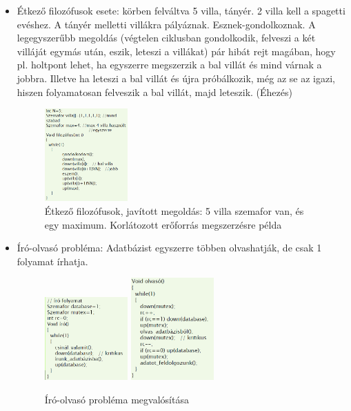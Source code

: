 \documentclass[margin=0px]{article}
\begin{document}
	\begin{itemize}
		\item Étkező filozófusok esete: körben felváltva 5 villa, tányér. 2 villa kell a spagetti
		evéshez. A tányér melletti villákra pályáznak. Esznek-gondolkoznak. A legegyszerűbb megoldás (végtelen ciklusban gondolkodik, felveszi a két villáját egymás után, eszik, leteszi a villákat) pár hibát rejt magában, hogy pl. holtpont lehet, ha egyszerre megszerzik a bal villát és mind várnak a jobbra. Illetve ha leteszi a bal villát és újra próbálkozik, még az
		se az igazi, hiszen folyamatosan felveszik a bal villát, majd leteszik. (Éhezés)
		\begin{figure}[H]
			\centering
			\includegraphics[width=0.3\textwidth]{img/filo.png}
			\caption{Étkező filozófusok, javított megoldás: 5 villa szemafor van, és egy maximum. Korlátozott erőforrás megszerzésre példa}
		\end{figure}
		\item Író-olvasó probléma: Adatbázist egyszerre többen olvashatják, de csak 1 folyamat írhatja.
		\begin{figure}[H]
			\centering
			\includegraphics[width=0.3\textwidth]{img/iro.png}
			\includegraphics[width=0.3\textwidth]{img/olvaso.png}
			\caption{Író-olvasó probléma megvalósítása}
		\end{figure}
	\end{itemize}
	
\end{document}
